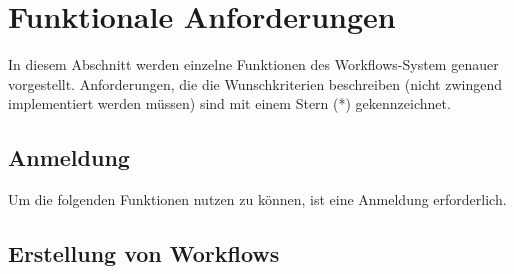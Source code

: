 \chapter{Funktionale Anforderungen}

    In diesem Abschnitt werden einzelne Funktionen des Workflows-System genauer vorgestellt.
    Anforderungen, die die Wunschkriterien beschreiben (nicht zwingend implementiert werden müssen) sind mit einem Stern (*) gekennzeichnet.
    
    \section{Anmeldung} \label{anmeldung:1}
        Um die folgenden Funktionen nutzen zu können, ist eine Anmeldung erforderlich.
    
    \section{Erstellung von Workflows} %

